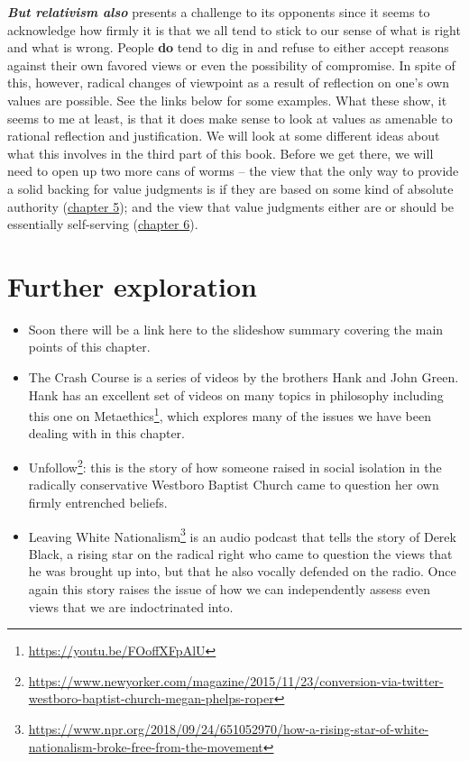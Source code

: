 \documentclass[12pt, openany]{book}
\renewcommand{\href}[2]{#2\footnote{\url{#1}}}
\begin{document}
\textbf{\emph{But relativism also}} presents a challenge to its opponents since it seems to acknowledge how firmly it is that we all tend to stick to our sense of what is right and what is wrong. People \textbf{do} tend to dig in and refuse to either accept reasons against their own favored views or even the possibility of compromise. In spite of this, however, radical changes of viewpoint as a result of reflection on one's own values are possible. See the links below for some examples. What these show, it seems to me at least, is that it does make sense to look at values as amenable to rational reflection and justification. We will look at some different ideas about what this involves in the third part of this book. Before we get there, we will need to open up two more cans of worms -- the view that the only way to provide a solid backing for value judgments is if they are based on some kind of absolute authority (\protect\hyperlink{religion}{chapter 5}); and the view that value judgments either are or should be essentially self-serving (\protect\hyperlink{egoism}{chapter 6}).

\hypertarget{further-exploration-3}{%
\section*{Further exploration}\label{further-exploration-3}}


\begin{itemize}
\item
  Soon there will be a link here to the slideshow summary covering the main points of this chapter.
\item
  The Crash Course is a series of videos by the brothers Hank and John Green. Hank has an excellent set of videos on many topics in philosophy including this one on \href{https://youtu.be/FOoffXFpAlU}{Metaethics}, which explores many of the issues we have been dealing with in this chapter.
\item
  \href{https://www.newyorker.com/magazine/2015/11/23/conversion-via-twitter-westboro-baptist-church-megan-phelps-roper}{Unfollow}: this is the story of how someone raised in social isolation in the radically conservative Westboro Baptist Church came to question her own firmly entrenched beliefs.
\item
  \href{https://www.npr.org/2018/09/24/651052970/how-a-rising-star-of-white-nationalism-broke-free-from-the-movement}{Leaving White Nationalism} is an audio podcast that tells the story of Derek Black, a rising star on the radical right who came to question the views that he was brought up into, but that he also vocally defended on the radio. Once again this story raises the issue of how we can independently assess even views that we are indoctrinated into.
\end{itemize}
\end{document}
